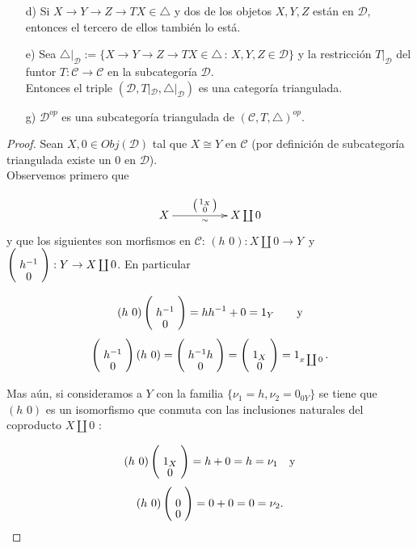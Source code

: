 \documentclass{article}
\newcommand{\spmat}[1]{%
  \left(\begin{smallmatrix}#1\end{smallmatrix}\right)%
}
\begin{document}
\begin{enumerate}
\begin{itemize}
\item[d)] Si $X\to Y\to Z\to TX \in \triangle$ y dos de los objetos $X,Y,Z$ están en $\mathscr{D}$, entonces el tercero de ellos también lo está.

\item[e)] Sea $\triangle|_\mathscr{D}:=\{X\to Y\to Z\to TX \in \triangle\,:\, X,Y,Z\in \mathscr{D}\}$ y la
restricción $T|_\mathscr{D}$ del funtor $T:\mathscr{C}\to\mathscr{C}$ en la subcategoría $\mathscr{D}$.\\
Entonces el triple $(\mathscr{D},T|_\mathscr{D},\triangle|_\mathscr{D})$ es una categoría triangulada.

\item[g)] $\mathscr{D}^{op}$ es una subcategoría triangulada de $(\mathscr{C},T,\triangle)^{op}$.
\end{itemize}

\begin{proof}
 Sean $X,0\in Obj(\mathscr{D})$ tal que $X\cong Y$ en $\mathscr{C}$ (por definición de subcategoría triangulada existe un $0$ en 
$\mathscr{D}$).\\

Observemos primero que

\begin{equation*}
\xymatrix@C+2pc{X\ar[r]_{\sim}^{\spmat{1_X \\ 0}}& X\coprod 0}\\
\end{equation*}
y que los siguientes son morfismos en $\mathscr{C}$:  $(h\,\,0): X\coprod 0\rightarrow Y$\,\,\,y\,\,\, 
$\left(\xymatrix@R=-1mm{h^{-1}\\0}\right):Y\rightarrow X\coprod 0$. En particular 

\[(h\,\,0) \left(\xymatrix@R=-1mm{h^{-1}\\0}\right)=hh^{-1} +0=1_Y\qquad \text{y}\]
\[\left(\xymatrix@R=-1mm{h^{-1}\\0}\right) (h\,\,0)=\left(\xymatrix@R=-1mm{h^{-1}h\\0}\right)
=\left(\xymatrix@R=-1mm{1_X\\0}\right)=1_{x\coprod 0}\,.\]

Mas aún, si consideramos a $Y$ con la familia $\{\nu_1=h, \nu_2=0_{0Y}\}$ se tiene que $(h\,\,0)$ es un isomorfismo que conmuta con las 
inclusiones naturales del coproducto $X\coprod 0$ :

\[(h\,\,0) \left(\xymatrix@R=-1mm{1_X\\0}\right)=h+0=h=\nu_1\quad \text{y}\]
\[(h\,\,0) \left(\xymatrix@R=-1mm{0\\0}\right)=0+0=0=\nu_2.\]


\end{proof}
\end{enumerate}
\end{document}
